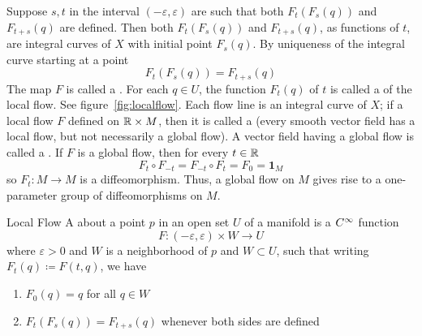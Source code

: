 Suppose \(s,t\) in the interval \((-\varepsilon, \varepsilon)\) are such that both \(F_t(F_s(q))\) and \(F_{t+s}(q)\) are defined.
Then both \(F_t(F_s(q))\) and \(F_{t+s}(q)\), as functions of \(t\), are integral curves of \(X\) with initial point \(F_s(q)\).
By uniqueness of the integral curve starting at a point 
\[
    F_t(F_s(q)) = F_{t+s}(q)   
\]
The map \(F\) is called a .
For each \(q \in U\), the function \(F_t(q)\) of \(t\) is called a  of the local flow.
See figure~\ref{fig:localflow}.
Each flow line is an integral curve of \(X\); if a local flow \(F\) defined on \(\mathbb{R} \times M\), then it is called a  (every smooth vector field has a local flow, but not necessarily a global flow).
A vector field having a global flow is called a .
If \(F\) is a global flow, then for every \(t \in \mathbb{R}\)
\[
    F_t \circ F_{-t} = F_{-t} \circ F_t = F_0 = \bm{1}_M
\]
so \(F_t \colon M \rightarrow M\) is a diffeomorphism.
Thus, a global flow on \(M\) gives rise to a one-parameter group of diffeomorphisms on \(M\).

\begin{definition}{Local Flow}{}
    A  about a point \(p\) in an open set \(U\) of a manifold is a \(C^\infty\) function 
    \[
         F \colon   (-\varepsilon, \varepsilon) \times W \rightarrow U
    \]
    where \(\varepsilon > 0\) and \(W\) is a neighborhood of \(p\) and \(W \subset U\), such that writing \(F_t(q)\coloneqq F(t,q)\), we have 
    \begin{enumerate}
        \item \(F_0(q) = q\) for all \(q \in W\)
        \item \(F_t(F_s(q)) = F_{t+s}(q)\) whenever both sides are defined
    \end{enumerate}
\end{definition}

